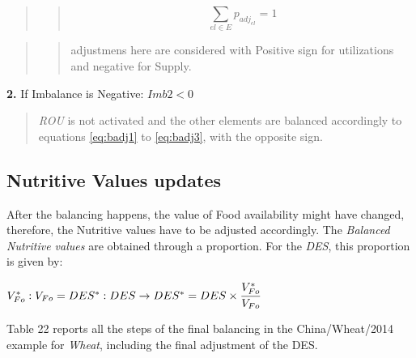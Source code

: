 \documentclass[]{article}
\begin{document}
\begin{quote}
\begin{quote}
\begin{equation}
\label{eq:badj3}
\sum \limits_{el \in E} p_{adj_{el}} = 1
\end{equation}
\end{quote}
\end{quote}

\begin{quote}
\begin{quote}
adjustmens here are considered with Positive sign for utilizations and
negative for Supply.
\end{quote}
\end{quote}

\textbf{2.} If Imbalance is Negative: \(Imb2 < 0\)

\begin{quote}
\emph{ROU} is not activated and the other elements are balanced
accordingly to equations \ref{eq:badj1} to \ref{eq:badj3}, with the
opposite sign.
\end{quote}

\subsection*{Nutritive Values updates}\label{nutritive-values-updates}

After the balancing happens, the value of Food availability might have
changed, therefore, the Nutritive values have to be adjusted
accordingly. The \emph{Balanced Nutritive values} are obtained through a
proportion. For the \emph{DES}, this proportion is given by:

\(V^*_{Fo} : V_{Fo} = DES^* : DES \rightarrow DES^* = DES \times \cfrac{V^*_{Fo}}{V_{Fo}}\)

Table 22 reports all the steps of the final balancing in the
China/Wheat/2014 example for \emph{Wheat}, including the final
adjustment of the DES.
\end{document}
